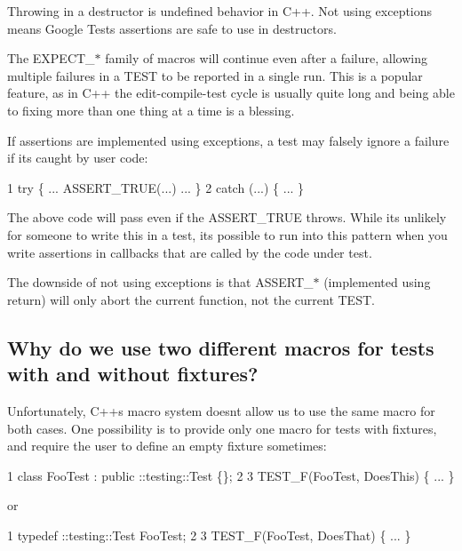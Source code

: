 \begin{DoxyEnumerate}
\item Throwing in a destructor is undefined behavior in C++. Not using exceptions means Google Test\textquotesingle{}s assertions are safe to use in destructors.
\end{DoxyEnumerate}
\begin{DoxyEnumerate}
\item The {\ttfamily E\+X\+P\+E\+C\+T\+\_\+$\ast$} family of macros will continue even after a failure, allowing multiple failures in a {\ttfamily T\+E\+ST} to be reported in a single run. This is a popular feature, as in C++ the edit-\/compile-\/test cycle is usually quite long and being able to fixing more than one thing at a time is a blessing.
\end{DoxyEnumerate}
\begin{DoxyEnumerate}
\item If assertions are implemented using exceptions, a test may falsely ignore a failure if it\textquotesingle{}s caught by user code\+: 
\begin{DoxyCode}
1 try \{ ... ASSERT\_TRUE(...) ... \}
2 catch (...) \{ ... \}
\end{DoxyCode}
 The above code will pass even if the {\ttfamily A\+S\+S\+E\+R\+T\+\_\+\+T\+R\+UE} throws. While it\textquotesingle{}s unlikely for someone to write this in a test, it\textquotesingle{}s possible to run into this pattern when you write assertions in callbacks that are called by the code under test.
\end{DoxyEnumerate}

The downside of not using exceptions is that {\ttfamily A\+S\+S\+E\+R\+T\+\_\+$\ast$} (implemented using {\ttfamily return}) will only abort the current function, not the current {\ttfamily T\+E\+ST}.

\subsection*{Why do we use two different macros for tests with and without fixtures?}

Unfortunately, C++\textquotesingle{}s macro system doesn\textquotesingle{}t allow us to use the same macro for both cases. One possibility is to provide only one macro for tests with fixtures, and require the user to define an empty fixture sometimes\+:


\begin{DoxyCode}
1 class FooTest : public ::testing::Test \{\};
2 
3 TEST\_F(FooTest, DoesThis) \{ ... \}
\end{DoxyCode}
 or 
\begin{DoxyCode}
1 typedef ::testing::Test FooTest;
2 
3 TEST\_F(FooTest, DoesThat) \{ ... \}
\end{DoxyCode}


